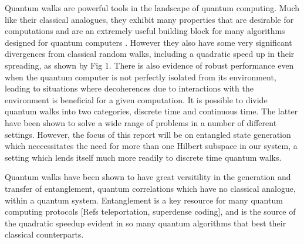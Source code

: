 Quantum walks are powerful tools in the landscape of quantum computing. 
Much like their classical analogues, they exhibit many properties that are desirable for computations and are an extremely useful building block for many algorithms designed for quantum computers \cite{shenvi2003}. 
However they also have some very significant divergences from classical random walks, including a quadratic speed up in their spreading, as shown by Fig 1. 
There is also evidence of robust performance even when the quantum computer is not perfectly isolated from its environment, leading to situations where decoherences due to interactions with the environment is beneficial for a given computation. 
It is possible to divide quantum walks into two categories, discrete time and continuous time. 
The latter have been shown to solve a wide range of problems in a number of different settings. 
However, the focus of this report will be on entangled state generation which neccessitates the need for more than one Hilbert subspace in our system, a setting which lends itself much more readily to discrete time quantum walks.\newline

Quantum walks have been shown to have great versitility in the generation and transfer of entanglement, quantum correlations which have no classical analogue, within a quantum system. 
Entanglement is a key resource for many quantum computing protocols \cite{qkd}\cite{qteleport}[Refs teleportation, superdense coding], and is the source of the quadratic speedup evident in so many quantum algorithms that best their classical counterparts.